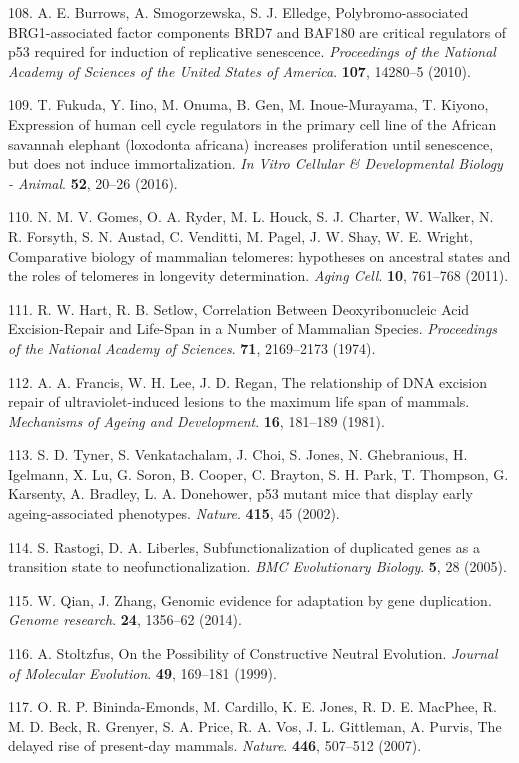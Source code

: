 \documentclass[]{elsarticle} %
\begin{document}
\leavevmode\hypertarget{ref-Burrows2010}{}%
108. A. E. Burrows, A. Smogorzewska, S. J. Elledge, Polybromo-associated BRG1-associated factor components BRD7 and BAF180 are critical regulators of p53 required for induction of replicative senescence. \emph{Proceedings of the National Academy of Sciences of the United States of America}. \textbf{107}, 14280--5 (2010).

\leavevmode\hypertarget{ref-Fukuda:20161c2}{}%
109. T. Fukuda, Y. Iino, M. Onuma, B. Gen, M. Inoue-Murayama, T. Kiyono, Expression of human cell cycle regulators in the primary cell line of the African savannah elephant (loxodonta africana) increases proliferation until senescence, but does not induce immortalization. \emph{In Vitro Cellular \& Developmental Biology - Animal}. \textbf{52}, 20--26 (2016).

\leavevmode\hypertarget{ref-Gomes2011}{}%
110. N. M. V. Gomes, O. A. Ryder, M. L. Houck, S. J. Charter, W. Walker, N. R. Forsyth, S. N. Austad, C. Venditti, M. Pagel, J. W. Shay, W. E. Wright, Comparative biology of mammalian telomeres: hypotheses on ancestral states and the roles of telomeres in longevity determination. \emph{Aging Cell}. \textbf{10}, 761--768 (2011).

\leavevmode\hypertarget{ref-Hart1974}{}%
111. R. W. Hart, R. B. Setlow, Correlation Between Deoxyribonucleic Acid Excision-Repair and Life-Span in a Number of Mammalian Species. \emph{Proceedings of the National Academy of Sciences}. \textbf{71}, 2169--2173 (1974).

\leavevmode\hypertarget{ref-Francis1981}{}%
112. A. A. Francis, W. H. Lee, J. D. Regan, The relationship of DNA excision repair of ultraviolet-induced lesions to the maximum life span of mammals. \emph{Mechanisms of Ageing and Development}. \textbf{16}, 181--189 (1981).

\leavevmode\hypertarget{ref-Tyner:20021c2}{}%
113. S. D. Tyner, S. Venkatachalam, J. Choi, S. Jones, N. Ghebranious, H. Igelmann, X. Lu, G. Soron, B. Cooper, C. Brayton, S. H. Park, T. Thompson, G. Karsenty, A. Bradley, L. A. Donehower, p53 mutant mice that display early ageing-associated phenotypes. \emph{Nature}. \textbf{415}, 45 (2002).

\leavevmode\hypertarget{ref-Rastogi2005}{}%
114. S. Rastogi, D. A. Liberles, Subfunctionalization of duplicated genes as a transition state to neofunctionalization. \emph{BMC Evolutionary Biology}. \textbf{5}, 28 (2005).

\leavevmode\hypertarget{ref-QianAndZhang2014}{}%
115. W. Qian, J. Zhang, Genomic evidence for adaptation by gene duplication. \emph{Genome research}. \textbf{24}, 1356--62 (2014).

\leavevmode\hypertarget{ref-Stoltzfus1999}{}%
116. A. Stoltzfus, On the Possibility of Constructive Neutral Evolution. \emph{Journal of Molecular Evolution}. \textbf{49}, 169--181 (1999).

\leavevmode\hypertarget{ref-Bininda-Emonds2007}{}%
117. O. R. P. Bininda-Emonds, M. Cardillo, K. E. Jones, R. D. E. MacPhee, R. M. D. Beck, R. Grenyer, S. A. Price, R. A. Vos, J. L. Gittleman, A. Purvis, The delayed rise of present-day mammals. \emph{Nature}. \textbf{446}, 507--512 (2007).
\end{document}
